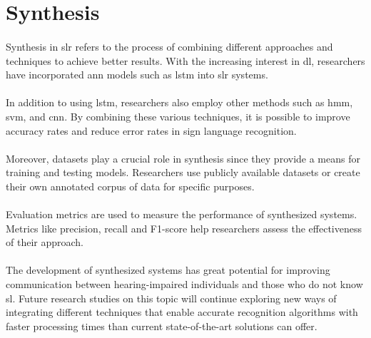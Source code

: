 \section{Synthesis}
\paragraph{}
Synthesis in \ac{slr} refers to the process of combining different approaches and techniques to achieve better results. With the increasing interest in \ac{dl}, researchers have incorporated \ac{ann} models such as \ac{lstm} into \ac{slr} systems.
\paragraph{}
In addition to using \ac{lstm}, researchers also employ other methods such as \ac{hmm}, \ac{svm}, and \ac{cnn}. By combining these various techniques, it is possible to improve accuracy rates and reduce error rates in sign language recognition.
\paragraph{}
Moreover, datasets play a crucial role in synthesis since they provide a means for training and testing models. Researchers use publicly available datasets or create their own annotated corpus of data for specific purposes.
\paragraph{}
Evaluation metrics are used to measure the performance of synthesized systems. Metrics like precision, recall and F1-score help researchers assess the effectiveness of their approach.
\paragraph{}
The development of synthesized systems has great potential for improving communication between hearing-impaired individuals and those who do not know \ac{sl}. Future research studies on this topic will continue exploring new ways of integrating different techniques that enable accurate recognition algorithms with faster processing times than current state-of-the-art solutions can offer.
